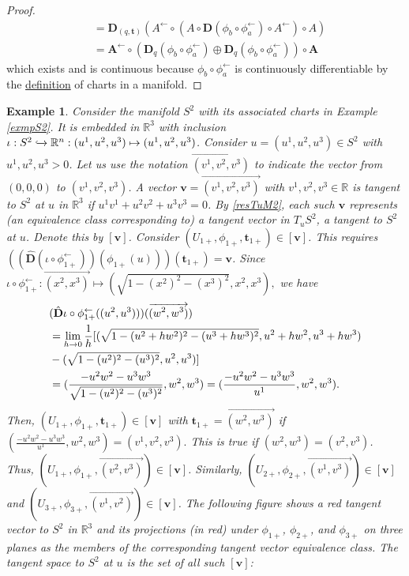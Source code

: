 \documentclass[letterpaper,12pt]{article}
\theoremstyle{plain}
\theoremstyle{plain}
\newtheorem{exmp}{Example}
\theoremstyle{definition}
\begin{document}
\begin{proof}
\begin{align*}
&= \mathbf{D}_{(q,\mathbf{t})}\left( A^{\leftarrow} \circ \left( A \circ \mathbf{D}(\phi_b\circ\phi_a^{\leftarrow} ) \circ A^{\leftarrow} \right) \circ A \right) \\
&= \mathbf{A}^{\leftarrow} \circ \left( \mathbf{D}_q\left( \phi_b \circ \phi_a^{\leftarrow} \right) \oplus \mathbf{D}_q\left( \phi_b \circ \phi_a^{\leftarrow}\right) \right) \circ \mathbf{A}
\end{align*}
which exists and is continuous because $\phi_b\circ \phi_a^{\leftarrow}$ is continuously differentiable by the \hyperref[defmfold]{definition} of charts in a manifold.
\end{proof}

\begin{exmp}\label{exmpTM}
Consider the manifold $S^2$ with its associated charts in Example \ref{exmpS2}. It is embedded in $\mathbb{R}^3$ with inclusion $\iota:S^2\xhookrightarrow{}\mathbb{R}^n:(u^1,u^2,u^3)\mapsto(u^1,u^2,u^3)$. Consider $u=(u^1,u^2,u^3)\in S^2$ with $u^1,u^2,u^3>0$. Let us use the notation $\overrightarrow{(v^1,v^2,v^3)}$ to indicate the vector from $(0,0,0)$ to $(v^1,v^2,v^3)$. A vector $\mathbf{v}=\overrightarrow{(v^1,v^2,v^3)}$ with $v^1,v^2,v^3\in\mathbb{R}$ is tangent to $S^2$ at $u$ in $\mathbb{R}^3$ if $u^1v^1+u^2v^2+u^3v^3=0$. By \autoref{resTuM2}, each such $\mathbf{v}$ represents (an equivalence class corresponding to) a tangent vector in $T_uS^2$, a tangent to $S^2$ at $u$. Denote this by $[\mathbf{v}]$. Consider $(U_{1+},\phi_{1+},\mathbf{t}_{1+}) \in [\mathbf{v}]$. This requires $((\hat{\mathbf{D}}(\iota \circ \phi_{1+}^{\leftarrow}))(\phi_{1+}(u)))(\mathbf{t}_{1+})=\mathbf{v}$.
Since $\iota \circ \phi_{1+}^{\leftarrow}:\overrightarrow{(x^2,x^3)}\mapsto(\sqrt{1-(x^2)^2-(x^3)^2},x^2,x^3),$ we have
\begin{align*}
\tiny
&(\hat{\mathbf{D}}\iota \circ \phi_{1+}^{\leftarrow}((u^2,u^3)))(\overrightarrow{(w^2,w^3)}) \\
&= \lim_{h\to 0}\frac{1}{h}[ (\sqrt{1-(u^2+hw^2)^2-(u^3+hw^3)^2},u^2+hw^2,u^3+hw^3) \\
&-(\sqrt{1-(u^2)^2-(u^3)^2},u^2,u^3)]\\
&=(\frac{-u^2w^2-u^3w^3}{\sqrt{1-(u^2)^2-(u^3)^2}},w^2,w^3)=(\frac{-u^2w^2-u^3w^3}{u^1},w^2,w^3).
\end{align*}
Then, $(U_{1+},\phi_{1+},\mathbf{t}_{1+}) \in [\mathbf{v}]$ with $\mathbf{t}_{1+}=\overrightarrow{(w^2,w^3)}$ if $(\frac{-u^2w^2-u^3w^3}{u^1},w^2,w^3)=(v^1,v^2,v^3).$ This is true if $(w^2,w^3)=(v^2,v^3)$. Thus, $(U_{1+},\phi_{1+},\overrightarrow{(v^2,v^3)}) \in [\mathbf{v}]$. Similarly, $(U_{2+},\phi_{2+},\overrightarrow{(v^1,v^3)}) \in [\mathbf{v}]$ and $(U_{3+},\phi_{3+},\overrightarrow{(v^1,v^2)}) \in [\mathbf{v}]$. The following figure shows a red tangent vector to $S^2$ in $\mathbb{R}^3$ and its projections (in red) under $\phi_{1+}$, $\phi_{2+}$, and $\phi_{3+}$ on three planes as the members of the corresponding tangent vector equivalence class. The tangent space to $S^2$ at $u$ is the set of all such $[\mathbf{v}]$:

\end{exmp}
\end{document}

